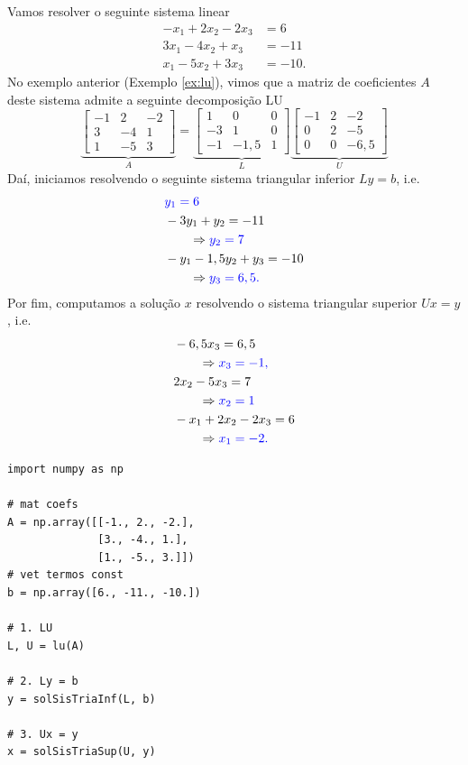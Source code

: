 \begin{ex}\label{ex:lu}
  Vamos resolver o seguinte sistema linear
  \begin{equation}
    \begin{aligned}
      -x_1 + 2x_2 - 2x_3 &= 6\\
      3x_1 - 4x_2 + x_3 &= -11\\
      x_1 - 5x_2 + 3x_3 &= -10.
    \end{aligned}
\end{equation}
  No exemplo anterior (Exemplo \ref{ex:lu}), vimos que a matriz de coeficientes $A$ deste sistema admite a seguinte decomposição LU
  \begin{equation}
    \underbrace{\begin{bmatrix}
      -1 & 2 & -2\\
      3 & -4 & 1\\
      1 & -5 & 3
    \end{bmatrix}}_{A} =
  \underbrace{\begin{bmatrix}
      1 & 0 & 0\\
      -3 & 1 & 0\\
      -1 & -1,5 & 1
    \end{bmatrix}}_{L}
  \underbrace{\begin{bmatrix}
      -1 & 2 & -2\\
      0 & 2 & -5\\
      0 & 0 & -6,5
    \end{bmatrix}}_{U}
  \end{equation}
  Daí, iniciamos resolvendo o seguinte sistema triangular inferior $Ly = b$, i.e.
  \begin{align}
    &\color{blue}y_1 = 6 \\
    &-3y_1 + y_2 = -11 \\
    &\qquad\Rightarrow \color{blue}y_2 = 7\\
    &-y_1 - 1,5y_2 + y_3 = -10 \\
    &\qquad\Rightarrow \color{blue}y_3 = 6,5.
  \end{align}
  Por fim, computamos a solução $x$ resolvendo o sistema triangular superior $Ux=y$, i.e.
  \begin{align}
    &-6,5x_3 = 6,5 \\
    &\qquad \Rightarrow \color{blue}x_3 = -1,\\
    &2x_2 - 5x_3 = 7 \\
    &\qquad \Rightarrow \color{blue}x_2 = 1\\
    &-x_1 + 2x_2 - 2x_3 = 6 \\
    &\qquad \Rightarrow \color{blue}x_1 = -2.
  \end{align}

\begin{lstlisting}
import numpy as np

# mat coefs
A = np.array([[-1., 2., -2.],
              [3., -4., 1.],
              [1., -5., 3.]])
# vet termos const
b = np.array([6., -11., -10.])

# 1. LU
L, U = lu(A)

# 2. Ly = b
y = solSisTriaInf(L, b)

# 3. Ux = y
x = solSisTriaSup(U, y)
\end{lstlisting}
\end{ex}


